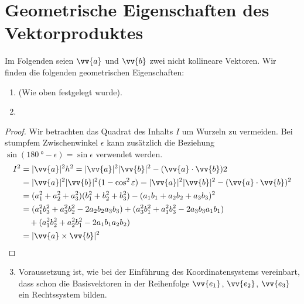\section{Geometrische Eigenschaften des Vektorproduktes}
Im Folgenden seien $\vv{a}$ und $\vv{b}$ zwei nicht kollineare Vektoren. Wir finden die folgenden geometrischen Eigenschaften:
\begin{enumerate}[I]
\item {} (Wie oben festgelegt wurde).
\item {}
\end{enumerate}
\begin{proof}
Wir betrachten das Quadrat des Inhalts $I$ um Wurzeln zu vermeiden. Bei stumpfem Zwischenwinkel $\epsilon$ kann zusätzlich die Beziehung $\sin{(\SI{180}{\degree} - \epsilon)} = \sin{\epsilon}$ verwendet werden.
\begin{align*}
    I^{2}   &= |\vv{a}|^{2} h^{2}  = |\vv{a}|^{2} |\vv{b}|^{2} - (\vv{a} \cdot \vv{b}){2} \\
            &= |\vv{a}|^{2} |\vv{b}|^{2} (1-\cos^{2}{\epsilon}) = |\vv{a}|^{2} |\vv{b}|^{2} - (\vv{a} \cdot \vv{b})^{2} \\
            &= (a_{1}^{2} + a_{2}^{2} + a_{3}^{2})(b_{1}^{2} + b_{2}^{2} + b_{3}^{2})-(a_{1}b_{1} + a_{2}b_{2} + a_{3}b_{3})^{2}\\
            &= (a_{1}^{2} b_{3}^{2}+ a_{3}^{2} b_{2}^{2} - 2 a_{2}b_{2}a_{3}b_{3}) + (a_{3}^{2}b_{1}^{2}+a_{1}^{2}b_{3}^{2} - 2 a_{3}b_{3} a_{1} b_{1})\\
            & \quad + (a_{1}^{2}b_{2}^{2} + a_{2}^{2} b_{1}^{2} - 2 a_{1} b_{1} a_{2} b_{2}) \\
            &=|\vv{a} \times \vv{b}|^{2} 
\end{align*}
\end{proof}
\begin{enumerate}[I]
\setcounter{enumi}{2}
\item {}\newline
Voraussetzung ist, wie bei der Einführung des Koordinatensystems vereinbart, dass schon die Basisvektoren in der Reihenfolge $\vv{e_{1}}$, $\vv{e_{2}}$, $\vv{e_{3}}$ ein Rechtssystem bilden.
\end{enumerate}

